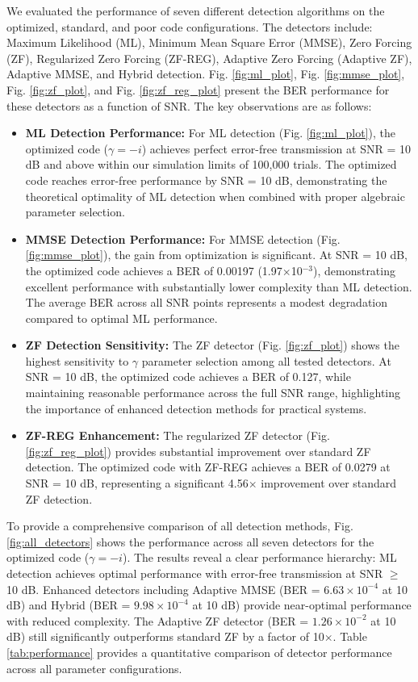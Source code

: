 We evaluated the performance of seven different detection algorithms on the optimized, standard, and poor code configurations. The detectors include: Maximum Likelihood (ML), Minimum Mean Square Error (MMSE), Zero Forcing (ZF), Regularized Zero Forcing (ZF-REG), Adaptive Zero Forcing (Adaptive ZF), Adaptive MMSE, and Hybrid detection. Fig. \ref{fig:ml_plot}, Fig. \ref{fig:mmse_plot}, Fig. \ref{fig:zf_plot}, and Fig. \ref{fig:zf_reg_plot} present the BER performance for these detectors as a function of SNR. The key observations are as follows:
\begin{itemize}
    \item \textbf{ML Detection Performance:} For ML detection (Fig. \ref{fig:ml_plot}), the optimized code (\(\gamma = -i\)) achieves perfect error-free transmission at SNR = 10 dB and above within our simulation limits of 100,000 trials. The optimized code reaches error-free performance by SNR = 10 dB, demonstrating the theoretical optimality of ML detection when combined with proper algebraic parameter selection.
    
    \item \textbf{MMSE Detection Performance:} For MMSE detection (Fig. \ref{fig:mmse_plot}), the gain from optimization is significant. At SNR = 10 dB, the optimized code achieves a BER of 0.00197 (1.97$\times$10$^{-3}$), demonstrating excellent performance with substantially lower complexity than ML detection. The average BER across all SNR points represents a modest degradation compared to optimal ML performance.
    
    \item \textbf{ZF Detection Sensitivity:} The ZF detector (Fig. \ref{fig:zf_plot}) shows the highest sensitivity to \(\gamma\) parameter selection among all tested detectors. At SNR = 10 dB, the optimized code achieves a BER of 0.127, while maintaining reasonable performance across the full SNR range, highlighting the importance of enhanced detection methods for practical systems.
    
    \item \textbf{ZF-REG Enhancement:} The regularized ZF detector (Fig. \ref{fig:zf_reg_plot}) provides substantial improvement over standard ZF detection. The optimized code with ZF-REG achieves a BER of 0.0279 at SNR = 10 dB, representing a significant 4.56$\times$ improvement over standard ZF detection.
\end{itemize}

To provide a comprehensive comparison of all detection methods, Fig. \ref{fig:all_detectors} shows the performance across all seven detectors for the optimized code (\(\gamma = -i\)). The results reveal a clear performance hierarchy: ML detection achieves optimal performance with error-free transmission at SNR $\geq$ 10 dB. Enhanced detectors including Adaptive MMSE (BER = $6.63 \times 10^{-4}$ at 10 dB) and Hybrid (BER = $9.98 \times 10^{-4}$ at 10 dB) provide near-optimal performance with reduced complexity. The Adaptive ZF detector (BER = $1.26 \times 10^{-2}$ at 10 dB) still significantly outperforms standard ZF by a factor of 10$\times$. Table \ref{tab:performance} provides a quantitative comparison of detector performance across all parameter configurations.

